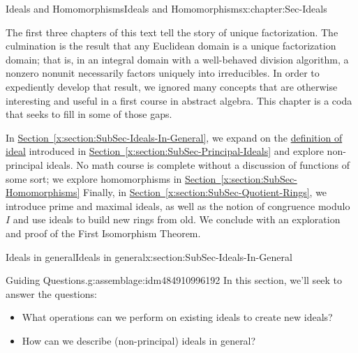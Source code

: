 \documentclass[oneside,10pt,]{book}
\newcommand{\xreffont}{\relax}
\numberwithin{equation}{section}
\begin{document}
\begin{chapterptx}{Ideals and Homomorphisms}{}{Ideals and Homomorphisms}{}{}{x:chapter:Sec-Ideals}
\begin{introduction}{}%
The first three chapters of this text tell the story of unique factorization. The culmination is the result that any Euclidean domain is a unique factorization domain; that is, in an integral domain with a well-behaved division algorithm, a nonzero nonunit necessarily factors uniquely into irreducibles. In order to expediently develop that result, we ignored many concepts that are otherwise interesting and useful in a first course in abstract algebra. This chapter is a coda that seeks to fill in some of those gaps.%
\par
In \hyperref[x:section:SubSec-Ideals-In-General]{Section~{\xreffont\ref{x:section:SubSec-Ideals-In-General}}}, we expand on the \hyperref[x:definition:def-ideal]{definition of ideal} introduced in \hyperref[x:section:SubSec-Principal-Ideals]{Section~{\xreffont\ref{x:section:SubSec-Principal-Ideals}}} and explore non-principal ideals. No math course is complete without a discussion of functions of some sort; we explore homomorphisms in \hyperref[x:section:SubSec-Homomorphisms]{Section~{\xreffont\ref{x:section:SubSec-Homomorphisms}}} Finally, in \hyperref[x:section:SubSec-Quotient-Rings]{Section~{\xreffont\ref{x:section:SubSec-Quotient-Rings}}}, we introduce prime and maximal ideals, as well as the notion of congruence modulo \(I\) and use ideals to build new rings from old. We conclude with an exploration and proof of the First Isomorphism Theorem.%
\end{introduction}%
%
%
\typeout{************************************************}
\typeout{************************************************}
%
\begin{sectionptx}{Ideals in general}{}{Ideals in general}{}{}{x:section:SubSec-Ideals-In-General}
\begin{assemblage}{Guiding Questions.}{g:assemblage:idm484910996192}%
In this section, we'll seek to answer the questions: %
\begin{itemize}[label=\textbullet]
\item{}What operations can we perform on existing ideals to create new ideals?%
\item{}How can we describe (non-principal) ideals in general?%
\end{itemize}
%
\end{assemblage}
\begin{introduction}{}%

\end{introduction}
\end{sectionptx}
\end{chapterptx}
\end{document}
